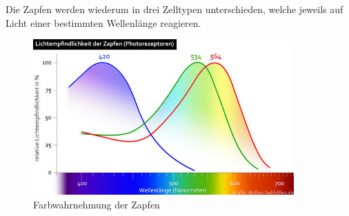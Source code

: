 Die Zapfen werden wiederum in drei Zelltypen unterschieden, welche jeweils auf Licht einer bestimmten Wellenlänge reagieren. 

\begin{figure}
	\centering
	\includegraphics[width=10cm]{images/zapfen.jpg}
	\caption{Farbwahrnehmung der Zapfen \cite{bs:auge}}
\end{figure}

